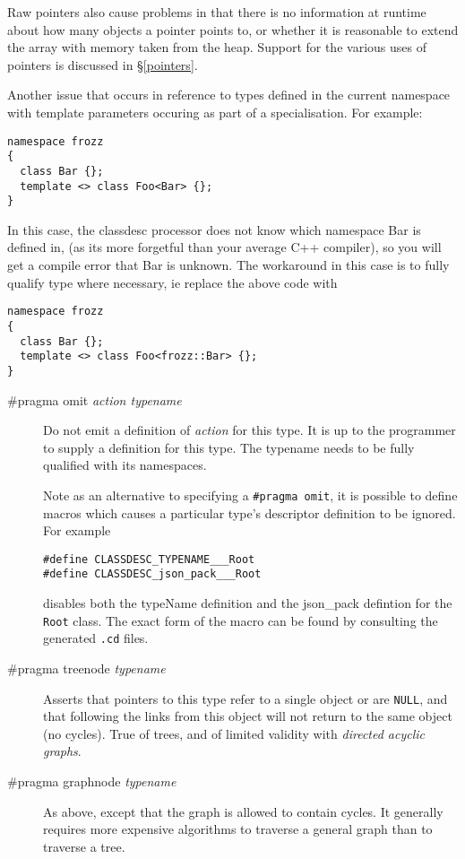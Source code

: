 Raw pointers also cause problems in that there is no information at
runtime about how many objects a pointer points to, or whether it is reasonable
to extend the array with memory taken from the heap. Support for the
various uses of pointers is discussed in \S\ref{pointers}.

Another issue that occurs in reference to types defined in the current
namespace with template parameters occuring as part of a
specialisation. For example:
\begin{verbatim}
namespace frozz
{
  class Bar {};
  template <> class Foo<Bar> {};
}
\end{verbatim}
In this case, the classdesc processor does not know which namespace
Bar is defined in, (as its more forgetful than your average C++
compiler), so you will get a compile error that Bar is unknown. The
workaround in this case is to fully qualify type where necessary, ie
replace the above code with
\begin{verbatim}
namespace frozz
{
  class Bar {};
  template <> class Foo<frozz::Bar> {};
}
\end{verbatim}



\begin{description}
\item[\#pragma omit {\em action typename}] Do not emit a definition of
{\em action} for this type. It is up to the programmer to supply a
definition for this type. The typename needs to be fully qualified
with its namespaces.

Note as an alternative to specifying a \verb+#pragma omit+, it is
possible to define macros which causes a particular type's
descriptor definition to be ignored. For example
\begin{verbatim}
#define CLASSDESC_TYPENAME___Root
#define CLASSDESC_json_pack___Root
\end{verbatim}
disables both the typeName definition and the json\_pack defintion for
the {\tt Root} class. The exact form of the macro can be found by
consulting the generated \verb+.cd+ files.

\item[\#pragma treenode {\em typename}] Asserts that pointers to this
type refer to a single object or are {\tt NULL}, and that following
the links from this object will not return to the same object (no
cycles). True of trees, and of limited validity with {\em directed
acyclic graphs}.
\item[\#pragma graphnode {\em typename}] As above, except that the
graph is allowed to contain cycles. It generally requires more
expensive algorithms to traverse a general graph than to traverse a tree.
\end{description}

